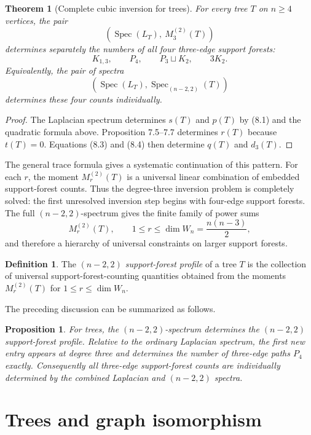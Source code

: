 \documentclass{amsart}
\newtheorem{theorem}{Theorem}
\newtheorem{proposition}{Proposition}
\theoremstyle{definition}
\newtheorem{definition}{Definition}
\newcommand{\Spec}{\operatorname{Spec}}
\begin{document}
\begin{theorem}[Complete cubic inversion for trees]
For every tree $T$ on $n\geq4$ vertices, the pair
\[
\left(\Spec(L_T),\ M_3^{(2)}(T)\right)
\]
determines separately the numbers of all four three-edge support forests:
\[
K_{1,3},\qquad P_4,\qquad P_3\sqcup K_2,\qquad 3K_2.
\]
Equivalently, the pair of spectra
\[
\left(\Spec(L_T),\Spec_{(n-2,2)}(T)\right)
\]
determines these four counts individually.
\end{theorem}

\begin{proof}
The Laplacian spectrum determines $s(T)$ and $p(T)$ by (8.1) and the
quadratic formula above.  Proposition 7.5--7.7 determines $r(T)$ because
$t(T)=0$.  Equations (8.3) and (8.4) then determine $q(T)$ and $d_3(T)$.
\end{proof}

The general trace formula gives a systematic continuation of this pattern.
For each $r$, the moment $M_r^{(2)}(T)$ is a universal linear combination
of embedded support-forest counts.  Thus the degree-three inversion problem
is completely solved: the first unresolved inversion step begins with
four-edge support forests.  The full $(n-2,2)$-spectrum gives the finite
family of power sums
\[
M_r^{(2)}(T),\qquad 1\le r\le\dim W_n=\frac{n(n-3)}2,
\]
and therefore a hierarchy of universal constraints on larger support
forests.

\begin{definition}
The \emph{$(n-2,2)$ support-forest profile} of a tree $T$ is the collection of
universal support-forest-counting quantities obtained from the moments
$M_r^{(2)}(T)$ for $1\le r\le \dim W_n$.
\end{definition}

The preceding discussion can be summarized as follows.

\begin{proposition}
For trees, the $(n-2,2)$-spectrum determines the $(n-2,2)$ support-forest
profile.  Relative to the ordinary Laplacian spectrum, the first new entry
appears at degree three and determines the number of three-edge paths
$P_4$ exactly.  Consequently all three-edge support-forest counts are
individually determined by the combined Laplacian and $(n-2,2)$ spectra.
\end{proposition}



\section{Trees and graph isomorphism}\label{sec:9} 
\end{document}
